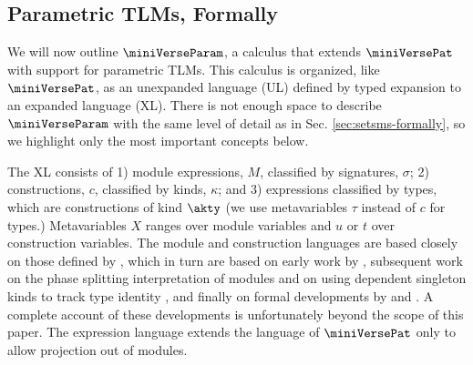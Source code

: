 \documentclass[acmsmall,10pt,review,anonymous]{acmart}\settopmatter{printfolios=true}
\begin{document}
\subsection{Parametric TLMs, Formally}

We will now outline $\miniVerseParam$, a calculus that extends $\miniVersePat$ with support for parametric TLMs. This calculus is organized, like $\miniVersePat$, as an unexpanded language (UL) defined by typed expansion to an expanded language (XL). There is not enough space to describe $\miniVerseParam$ with the same level of detail as in Sec. \ref{sec:setsms-formally}, so we highlight only the most important concepts below.

The XL consists of 1) module expressions, $M$, classified by signatures, $\sigma$; 2) constructions, $c$, classified by kinds, $\kappa$; and 3) expressions classified by types, which are constructions of kind $\akty$ (we use metavariables $\tau$ instead of $c$ for types.) Metavariables $X$ ranges over module variables and $u$ or $t$ over construction variables. The module and construction languages are based closely on those defined by \citet{pfple1}, which in turn are based on early work by \citet{MacQueen:1984:MSM:800055.802036,DBLP:conf/popl/MacQueen86}, subsequent work on the phase splitting interpretation of modules \cite{harper1989higher} and on using dependent singleton kinds to track type identity \cite{stone2006extensional,DBLP:conf/lfmtp/Crary09}, and finally on formal developments by \citet{dreyer2005understanding} and \citet{conf/popl/LeeCH07}. A complete account of these developments is unfortunately beyond the scope of this paper. The expression language extends the language of $\miniVersePat$ only to allow projection out of modules.
\end{document}
